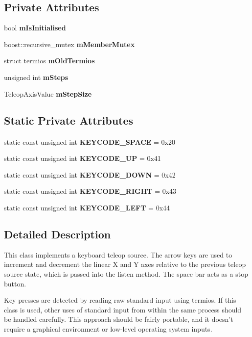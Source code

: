\subsection*{Private Attributes}
\begin{DoxyCompactItemize}
\item 
bool {\bf mIsInitialised}
\item 
boost::recursive\_\-mutex {\bf mMemberMutex}
\item 
struct termios {\bf mOldTermios}
\item 
unsigned int {\bf mSteps}
\item 
TeleopAxisValue {\bf mStepSize}
\end{DoxyCompactItemize}
\subsection*{Static Private Attributes}
\paragraph*{}
\begin{DoxyCompactItemize}
\item 
static const unsigned int {\bf KEYCODE\_\-SPACE} = 0x20
\item 
static const unsigned int {\bf KEYCODE\_\-UP} = 0x41
\item 
static const unsigned int {\bf KEYCODE\_\-DOWN} = 0x42
\item 
static const unsigned int {\bf KEYCODE\_\-RIGHT} = 0x43
\item 
static const unsigned int {\bf KEYCODE\_\-LEFT} = 0x44
\end{DoxyCompactItemize}



\subsection{Detailed Description}
This class implements a keyboard teleop source. The arrow keys are used to increment and decrement the linear X and Y axes relative to the previous teleop source state, which is passed into the listen method. The space bar acts as a stop button.

Key presses are detected by reading raw standard input using termios. If this class is used, other uses of standard input from within the same process should be handled carefully. This approach should be fairly portable, and it doesn't require a graphical environment or low-\/level operating system inputs. 

